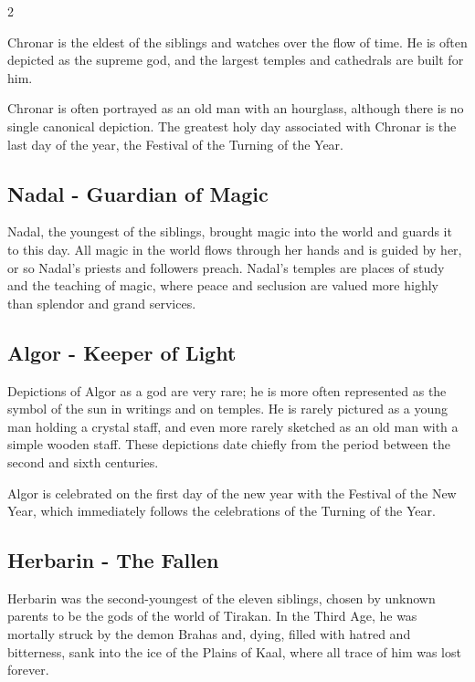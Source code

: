\begin{multicols}{2}
{Chronar is the eldest of the siblings and watches over the flow of time. He is often depicted as the supreme god, and the largest temples and cathedrals are built for him.

Chronar is often portrayed as an old man with an hourglass, although there is no single canonical depiction. The greatest holy day associated with Chronar is the last day of the year, the Festival of the Turning of the Year.

\subsection{Nadal - Guardian of Magic}\label{subsec:nadal-wachterin-der-magie}

Nadal, the youngest of the siblings, brought magic into the world and guards it to this day. All magic in the world flows through her hands and is guided by her, or so Nadal's priests and followers preach. Nadal's temples are places of study and the teaching of magic, where peace and seclusion are valued more highly than splendor and grand services.

\subsection{Algor - Keeper of Light}\label{subsec:algor-behuter-des-lichts}

Depictions of Algor as a god are very rare; he is more often represented as the symbol of the sun in writings and on temples. He is rarely pictured as a young man holding a crystal staff, and even more rarely sketched as an old man with a simple wooden staff. These depictions date chiefly from the period between the second and sixth centuries.

Algor is celebrated on the first day of the new year with the Festival of the New Year, which immediately follows the celebrations of the Turning of the Year.

\subsection{Herbarin - The Fallen}\label{subsec:herbarin-der-gefallene}

Herbarin was the second-youngest of the eleven siblings, chosen by unknown parents to be the gods of the world of Tirakan. In the Third Age, he was mortally struck by the demon Brahas and, dying, filled with hatred and bitterness, sank into the ice of the Plains of Kaal, where all trace of him was lost forever.

}
\end{multicols}
